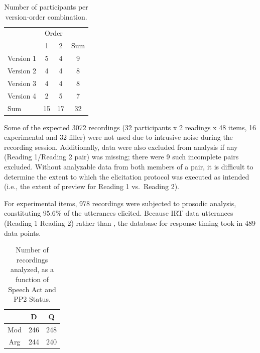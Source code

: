 \documentclass[12pt,oneside]{book}
\begin{document}
\begin{table}[!h]

\caption{\label{tab:vtab}Number of participants per version-order combination.}
\centering
\begin{tabular}{lccc}
\toprule
\multicolumn{1}{c}{ } & \multicolumn{2}{c}{Order} & \multicolumn{1}{c}{ } \\
\cmidrule(l{3pt}r{3pt}){2-3}
  & 1 & 2 & Sum\\
\midrule
Version 1 & 5 & 4 & 9\\
Version 2 & 4 & 4 & 8\\
Version 3 & 4 & 4 & 8\\
Version 4 & 2 & 5 & 7\\
Sum & 15 & 17 & 32\\
\bottomrule
\end{tabular}
\end{table}

Some of the expected 3072 recordings (32 participants x 2 readings x 48 items, 16 experimental and 32 filler) were not used due to intrusive noise during the recording session. Additionally, data were also excluded from analysis if any (Reading 1/Reading 2 pair) was missing; there were 9 such incomplete pairs excluded. Without analyzable data from both members of a pair, it is difficult to determine the extent to which the elicitation protocol was executed as intended (i.e., the extent of preview for Reading 1 vs.~Reading 2).

For experimental items, 978 recordings were subjected to prosodic analysis, constituting 95.6\% of the utterances elicited. Because IRT data  utterances  (Reading 1  Reading 2) rather than , the database for response timing took in 489 data points.

\begin{table}[!h]

\caption{\label{tab:rvtab}Number of recordings analyzed, as a function of Speech Act and PP2 Status.}
\centering
\begin{tabular}{ccc}
\toprule
  & D & Q\\
\midrule
Mod & 246 & 248\\
Arg & 244 & 240\\
\bottomrule
\end{tabular}
\end{table}
\end{document}
